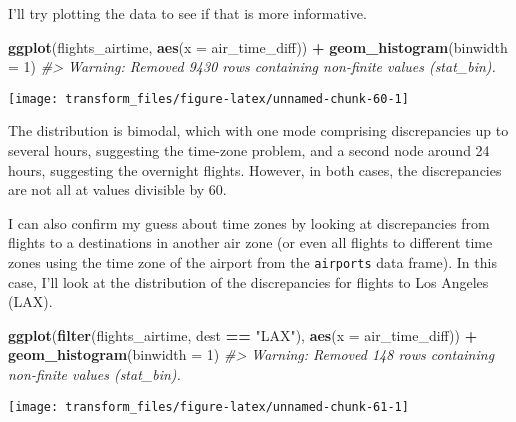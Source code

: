 \documentclass[]{book}
\newenvironment{Shaded}{\begin{snugshade}}{\end{snugshade}}
\newcommand{\CommentTok}[1]{\textcolor[rgb]{0.56,0.35,0.01}{\textit{#1}}}
\newcommand{\DataTypeTok}[1]{\textcolor[rgb]{0.13,0.29,0.53}{#1}}
\newcommand{\DecValTok}[1]{\textcolor[rgb]{0.00,0.00,0.81}{#1}}
\newcommand{\KeywordTok}[1]{\textcolor[rgb]{0.13,0.29,0.53}{\textbf{#1}}}
\newcommand{\NormalTok}[1]{#1}
\newcommand{\OperatorTok}[1]{\textcolor[rgb]{0.81,0.36,0.00}{\textbf{#1}}}
\newcommand{\StringTok}[1]{\textcolor[rgb]{0.31,0.60,0.02}{#1}}
\theoremstyle{plain}
\theoremstyle{remark}
\begin{document}
I'll try plotting the data to see if that is more informative.

\begin{Shaded}
\begin{Highlighting}[]
\KeywordTok{ggplot}\NormalTok{(flights_airtime, }\KeywordTok{aes}\NormalTok{(}\DataTypeTok{x =}\NormalTok{ air_time_diff)) }\OperatorTok{+}
\StringTok{  }\KeywordTok{geom_histogram}\NormalTok{(}\DataTypeTok{binwidth =} \DecValTok{1}\NormalTok{)}
\CommentTok{#> Warning: Removed 9430 rows containing non-finite values (stat_bin).}
\end{Highlighting}
\end{Shaded}

\begin{center}\texttt{[image: transform\_files/figure-latex/unnamed-chunk-60-1]} \end{center}

The distribution is bimodal, which with one mode comprising
discrepancies up to several hours, suggesting the time-zone problem, and
a second node around 24 hours, suggesting the overnight flights.
However, in both cases, the discrepancies are not all at values
divisible by 60.

I can also confirm my guess about time zones by looking at discrepancies
from flights to a destinations in another air zone (or even all flights
to different time zones using the time zone of the airport from the
\texttt{airports} data frame). In this case, I'll look at the
distribution of the discrepancies for flights to Los Angeles (LAX).

\begin{Shaded}
\begin{Highlighting}[]
\KeywordTok{ggplot}\NormalTok{(}\KeywordTok{filter}\NormalTok{(flights_airtime, dest }\OperatorTok{==}\StringTok{ "LAX"}\NormalTok{), }\KeywordTok{aes}\NormalTok{(}\DataTypeTok{x =}\NormalTok{ air_time_diff)) }\OperatorTok{+}
\StringTok{  }\KeywordTok{geom_histogram}\NormalTok{(}\DataTypeTok{binwidth =} \DecValTok{1}\NormalTok{)}
\CommentTok{#> Warning: Removed 148 rows containing non-finite values (stat_bin).}
\end{Highlighting}
\end{Shaded}

\begin{center}\texttt{[image: transform\_files/figure-latex/unnamed-chunk-61-1]} \end{center}
\end{document}
